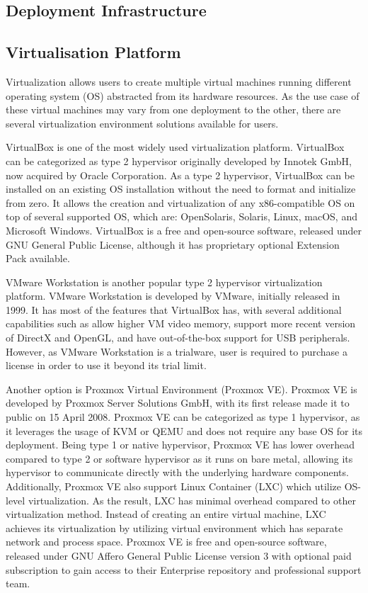 \documentclass[../index.tex]{subfiles}
\begin{document}
\subsection{Deployment Infrastructure}

\subsection{Virtualisation Platform}

Virtualization allows users to create multiple virtual machines running different operating system
(OS) abstracted from its hardware resources. As the use case of these virtual machines may vary from
one deployment to the other, there are several virtualization environment solutions available for
users.

VirtualBox is one of the most widely used virtualization platform. VirtualBox can be categorized as
type 2 hypervisor originally developed by Innotek GmbH, now acquired by Oracle Corporation. As a
type 2 hypervisor, VirtualBox can be installed on an existing OS installation without the need to
format and initialize from zero. It allows the creation and virtualization of any x86-compatible OS
on top of several supported OS, which are: OpenSolaris, Solaris, Linux, macOS, and Microsoft
Windows. VirtualBox is a free and open-source software, released under GNU General Public License,
although it has proprietary optional Extension Pack available.

VMware Workstation is another popular type 2 hypervisor virtualization platform. VMware Workstation
is developed by VMware, initially released in 1999. It has most of the features that VirtualBox has,
with several additional capabilities such as allow higher VM video memory, support more recent
version of DirectX and OpenGL, and have out-of-the-box support for USB peripherals. However, as
VMware Workstation is a trialware, user is required to purchase a license in order to use it beyond
its trial limit.

Another option is Proxmox Virtual Environment (Proxmox VE). Proxmox VE is developed by Proxmox
Server Solutions GmbH, with its first release made it to public on 15 April 2008. Proxmox VE can be
categorized as type 1 hypervisor, as it leverages the usage of KVM or QEMU and does not require any
base OS for its deployment. Being type 1 or native hypervisor, Proxmox VE has lower overhead
compared to type 2 or software hypervisor as it runs on bare metal, allowing its hypervisor to
communicate directly with the underlying hardware components. Additionally, Proxmox VE also support
Linux Container (LXC) which utilize OS- level virtualization. As the result, LXC has minimal
overhead compared to other virtualization method. Instead of creating an entire virtual machine, LXC
achieves its virtualization by utilizing virtual environment which has separate network and process
space. Proxmox VE is free and open-source software, released under GNU Affero General Public License
version 3 with optional paid subscription to gain access to their Enterprise repository and
professional support team.
\end{document}
